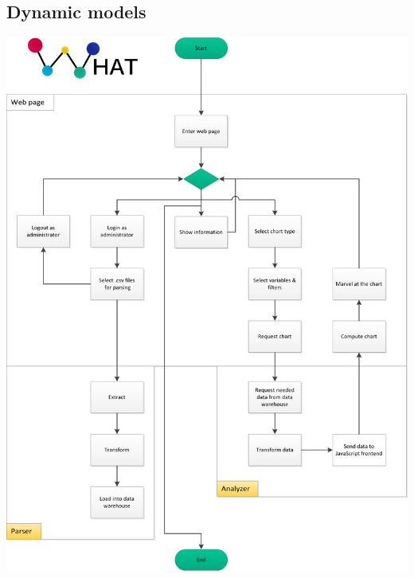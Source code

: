 \subsection{Dynamic models}
\begin{center}
\includegraphics[width=0.85\linewidth]{Pictures/Flow1.png}
\end{center} 

\newpage
